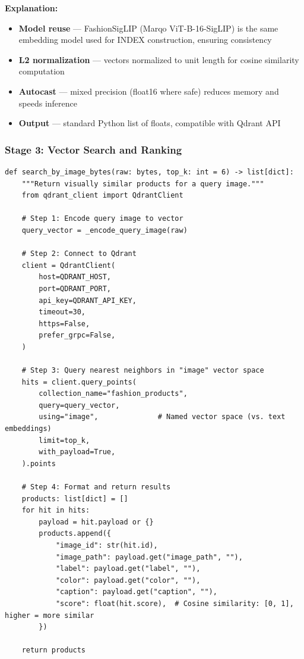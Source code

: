 \textbf{Explanation:}
\begin{itemize}
    \item \textbf{Model reuse} --- FashionSigLIP (Marqo ViT-B-16-SigLIP) is the same embedding model used for INDEX construction, ensuring consistency
    \item \textbf{L2 normalization} --- vectors normalized to unit length for cosine similarity computation
    \item \textbf{Autocast} --- mixed precision (float16 where safe) reduces memory and speeds inference
    \item \textbf{Output} --- standard Python list of floats, compatible with Qdrant API
\end{itemize}

\subsubsection{Stage 3: Vector Search and Ranking}

\begin{lstlisting}[caption={Qdrant Vector Search --- search/image\_query\_engine.py}]
def search_by_image_bytes(raw: bytes, top_k: int = 6) -> list[dict]:
    """Return visually similar products for a query image."""
    from qdrant_client import QdrantClient
    
    # Step 1: Encode query image to vector
    query_vector = _encode_query_image(raw)
    
    # Step 2: Connect to Qdrant
    client = QdrantClient(
        host=QDRANT_HOST,
        port=QDRANT_PORT,
        api_key=QDRANT_API_KEY,
        timeout=30,
        https=False,
        prefer_grpc=False,
    )
    
    # Step 3: Query nearest neighbors in "image" vector space
    hits = client.query_points(
        collection_name="fashion_products",
        query=query_vector,
        using="image",              # Named vector space (vs. text embeddings)
        limit=top_k,
        with_payload=True,
    ).points
    
    # Step 4: Format and return results
    products: list[dict] = []
    for hit in hits:
        payload = hit.payload or {}
        products.append({
            "image_id": str(hit.id),
            "image_path": payload.get("image_path", ""),
            "label": payload.get("label", ""),
            "color": payload.get("color", ""),
            "caption": payload.get("caption", ""),
            "score": float(hit.score),  # Cosine similarity: [0, 1], higher = more similar
        })
    
    return products
\end{lstlisting}

